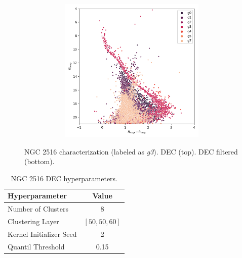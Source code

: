 \documentclass[11pt,a4paper,english,twocolumn]{article}
\begin{document}
\begin{figure}[htbp]
\begin{subfigure}{\columnwidth}
\begin{subfigure}[t]{0.30\textwidth}
    \end{subfigure}
    \hfill
    \begin{subfigure}[t]{0.30\textwidth}
      \centering
      \includegraphics[width=\textwidth]{../figures/ngc_2516/dec_hr_diagram_filtered_ngc_2516.png}
    \end{subfigure}
  \end{subfigure}
  \caption{NGC 2516 characterization (labeled as \emph{g3}).
           DEC (top). DEC filtered (bottom).}
  \label{fig:app_result_ngc_2516_dec}
\end{figure}

\begin{table}[htbp]
  \begin{center}
    \begin{tabular}{l|c}
      \textbf{Hyperparameter} & \textbf{Value} \\
      \hline
      Number of Clusters & 8 \\
      Clustering Layer & $\left[ 50, 50, 60 \right]$ \\
      Kernel Initializer Seed & 2 \\
      Quantil Threshold & 0.15 \\
    \end{tabular}
    \caption{NGC 2516 DEC hyperparameters.}
    \label{tab:app_hyperparameters_ngc_2516}
  \end{center}
\end{table}
\end{document}
